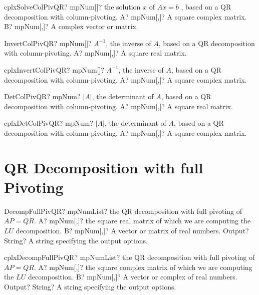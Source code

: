 \documentclass[12pt,a4paper,openany]{book}
\begin{document}
\begin{mpFunctionsExtract}
\mpFunctionTwo
{cplxSolveColPivQR? mpNum[]? the solution $x$ of $A x = b$ , based on a QR decomposition with column-pivoting.}
{A? mpNum[,]? A square complex matrix.}
{B? mpNum[,]? A complex vector or matrix.}
\end{mpFunctionsExtract}

\begin{mpFunctionsExtract}
\mpFunctionOne
{InvertColPivQR? mpNum[]? $A^{-1}$, the inverse of $A$, based on a QR decomposition with column-pivoting.}
{A? mpNum[,]? A square real matrix.}
\end{mpFunctionsExtract}

\begin{mpFunctionsExtract}
\mpFunctionOne
{cplxInvertColPivQR? mpNum[]? $A^{-1}$, the inverse of $A$, based on a QR decomposition with column-pivoting.}
{A? mpNum[,]? A square complex matrix.}
\end{mpFunctionsExtract}

\begin{mpFunctionsExtract}
\mpFunctionOne
{DetColPivQR? mpNum? $|A|$, the determinant of $A$, based on a QR decomposition with column-pivoting.}
{A? mpNum[,]? A square real matrix.}
\end{mpFunctionsExtract}

\begin{mpFunctionsExtract}
\mpFunctionOne
{cplxDetColPivQR? mpNum? $|A|$, the determinant of $A$, based on a QR decomposition with column-pivoting.}
{A? mpNum[,]? A square complex matrix.}
\end{mpFunctionsExtract}

\section{QR Decomposition with full Pivoting}

\begin{mpFunctionsExtract}
\mpFunctionThree
{DecompFullPivQR? mpNumList? the QR decomposition with full pivoting of $AP = QR$.}
{A? mpNum[,]? the square real matrix of which we are computing the $LU$ decomposition.}
{B? mpNum[,]? A vector or matrix of real numbers.}
{Output? String? A string specifying the output options.}
\end{mpFunctionsExtract}

\begin{mpFunctionsExtract}
\mpFunctionThree
{cplxDecompFullPivQR? mpNumList? the QR decomposition with full pivoting of $AP = QR$.}
{A? mpNum[,]? the square complex matrix of which we are computing the $LU$ decomposition.}
{B? mpNum[,]? A vector or complex of real numbers.}
{Output? String? A string specifying the output options.}
\end{mpFunctionsExtract}
\end{document}
